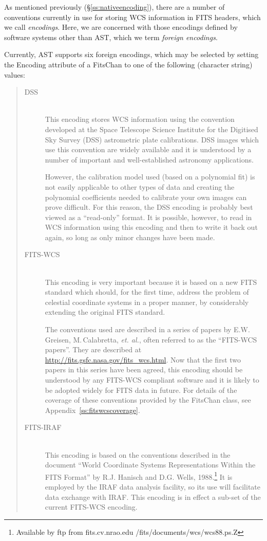 \documentclass[twoside,11pt]{starlink}
\providecommand{\appref}[1]{Appendix~\ref{#1}}
\providecommand{\secref}[1]{\S\ref{#1}}
\begin{document}
As mentioned previously (\secref{ss:nativeencoding}), there are a
number of conventions currently in use for storing WCS information in
FITS headers, which we call \emph{encodings}. Here, we are concerned
with those encodings defined by software systems other than AST, which
we term \emph{foreign encodings}.

Currently, AST supports six foreign encodings, which may be selected
by setting the Encoding attribute of a FitsChan to one of the
following (character string) values:

\begin{quote}
\begin{description}
\item[DSS]\mbox{}\\
This encoding stores WCS information using the convention developed at
the Space Telescope Science Institute for the Digitised Sky Survey
(DSS) astrometric plate calibrations.  DSS images which use this
convention are widely available and it is understood by a number of
important and well-established astronomy applications.

However, the calibration model used (based on a polynomial fit) is not
easily applicable to other types of data and creating the polynomial
coefficients needed to calibrate your own images can prove
difficult. For this reason, the DSS encoding is probably best viewed
as a ``read-only'' format. It is possible, however, to read in WCS
information using this encoding and then to write it back out again,
so long as only minor changes have been made.

\item[FITS-WCS]\mbox{}\\
This encoding is very important because it is based on a new FITS standard
which should, for the first time, address the problem of celestial coordinate
systems in a proper manner, by considerably extending the original FITS
standard.

The conventions used are described in a series of papers by
E.W.\,Greisen, M.\,Calabretta, \emph{et. al.}, often referred to as the
``FITS-WCS papers''. They are described at
\url{http://fits.gsfc.nasa.gov/fits_wcs.html}. Now that the first two papers
in this series have been agreed, this encoding should be understood by any
FITS-WCS compliant software and it is likely to be adopted widely for FITS
data in future.  For details of the coverage of these conventions provided
by the FitsChan class, see \appref{ss:fitswcscoverage}.

\item[FITS-IRAF]\mbox{}\\
This encoding is based on the conventions described in the document
``World Coordinate Systems Representations Within the FITS Format'' by R.J.
Hanisch and D.G. Wells, 1988.\footnote{Available by ftp from
fits.cv.nrao.edu /fits/documents/wcs/wcs88.ps.Z} It is employed
by the IRAF data analysis facility, so its use will facilitate data
exchange with IRAF. This encoding is in effect a sub-set of the current
FITS-WCS encoding.


\end{description}
\end{quote}
\end{document}
